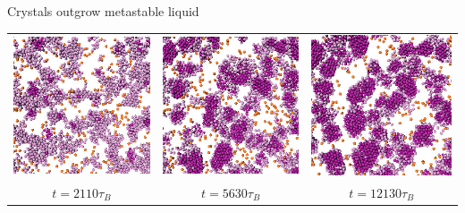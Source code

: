 \documentclass[xcolor=table]{beamer}
\begin{document}
\begin{frame}{Crystals outgrow metastable liquid}
	\let\imw\relax
	\newlength\imw
	\setlength{\imw}{0.29\linewidth}
	\begin{scriptsize}
	\begin{tabular}{ccc}
	\includegraphics[width=\imw]{presentation/sliceILM_t120.jpg}&
	\includegraphics[width=\imw]{presentation/sliceILM_t390.jpg}&
	\includegraphics[width=\imw]{presentation/sliceILM_t890.jpg}\\
	$t=2110\tau_B$ & $t=5630\tau_B$ & $t=12130\tau_B$\\
	\end{tabular}
	\end{scriptsize}
\end{frame}
\end{document}
